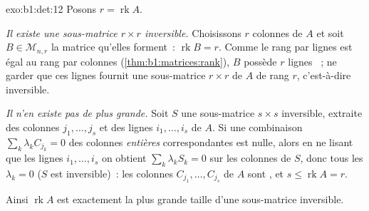 \begin{solution}{exo:b1:det:12}
Posons $r = \operatorname{rk} A$.

\emph{Il existe une sous-matrice $r \times r$ inversible.} Choisissons
$r$ colonnes  de $A$ et soit $B \in \mathcal{M}_{n,r}$ la
matrice qu'elles forment~: $\operatorname{rk} B = r$. Comme le rang
par lignes est égal au rang par colonnes
(\cref{thm:b1:matrices:rank}), $B$ possède $r$ lignes ~; ne
garder que ces lignes fournit une sous-matrice $r \times r$ de $A$ de
rang $r$, c'est-à-dire inversible.

\emph{Il n'en existe pas de plus grande.} Soit $S$ une sous-matrice
$s \times s$ inversible, extraite des colonnes $j_1, \dots, j_s$ et des
lignes $i_1, \dots, i_s$ de $A$. Si une combinaison $\sum_k \lambda_k
C_{j_k} = 0$ des colonnes \emph{entières} correspondantes est nulle,
alors en ne lisant que les lignes $i_1, \dots, i_s$ on obtient
$\sum_k \lambda_k S_k = 0$ sur les colonnes de $S$, donc tous les
$\lambda_k = 0$ ($S$ est inversible)~: les colonnes
$C_{j_1}, \dots, C_{j_s}$ de $A$ sont , et
$s \leq \operatorname{rk} A = r$.

Ainsi $\operatorname{rk} A$ est exactement la plus grande taille d'une
sous-matrice inversible.
\end{solution}

